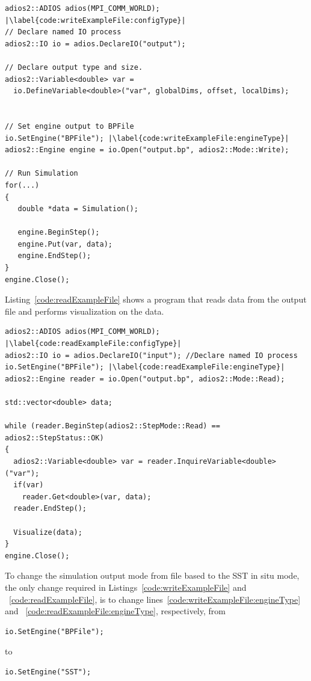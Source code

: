 \documentclass[x11names,table,xcdraw,graybox]{svmult}
\begin{document}
\begin{minipage}{\linewidth}
\begin{lstlisting}[frame=single,label={cxxAPI},caption={Example of simulation writing outputs to a file.}, label=code:writeExampleFile]
adios2::ADIOS adios(MPI_COMM_WORLD); |\label{code:writeExampleFile:configType}|
// Declare named IO process
adios2::IO io = adios.DeclareIO("output");

// Declare output type and size.
adios2::Variable<double> var =
  io.DefineVariable<double>("var", globalDims, offset, localDims);


// Set engine output to BPFile
io.SetEngine("BPFile"); |\label{code:writeExampleFile:engineType}|
adios2::Engine engine = io.Open("output.bp", adios2::Mode::Write);

// Run Simulation
for(...)
{
   double *data = Simulation();

   engine.BeginStep();
   engine.Put(var, data);
   engine.EndStep();
}
engine.Close();
\end{lstlisting}
\end{minipage}

Listing~\ref{code:readExampleFile} shows a program that reads data from the output file and performs visualization on the data.

\begin{minipage}{\linewidth}
\begin{lstlisting}[frame=single,label={cxxAPI},caption={Example of a visualization  program reading data from a file}, label=code:readExampleFile]
adios2::ADIOS adios(MPI_COMM_WORLD); |\label{code:readExampleFile:configType}|
adios2::IO io = adios.DeclareIO("input"); //Declare named IO process
io.SetEngine("BPFile"); |\label{code:readExampleFile:engineType}|
adios2::Engine reader = io.Open("output.bp", adios2::Mode::Read);

std::vector<double> data;

while (reader.BeginStep(adios2::StepMode::Read) == adios2::StepStatus::OK)
{
  adios2::Variable<double> var = reader.InquireVariable<double>("var");
  if(var)
    reader.Get<double>(var, data);
  reader.EndStep();

  Visualize(data);
}
engine.Close();
\end{lstlisting}
\end{minipage}

To change the simulation output mode from file based to the SST in situ mode, the only change required in Listings~\ref{code:writeExampleFile} and ~\ref{code:readExampleFile}, is to change lines~\ref{code:writeExampleFile:engineType} and ~\ref{code:readExampleFile:engineType}, respectively, from
\begin{lstlisting}[numbers=none]
io.SetEngine("BPFile");
\end{lstlisting}
to
\begin{lstlisting}[numbers=none]
io.SetEngine("SST");
\end{lstlisting}
\end{document}
